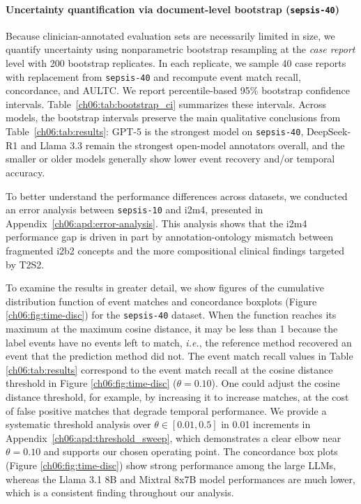 \paragraph{Uncertainty quantification via document-level bootstrap (\texttt{sepsis-40})}
Because clinician-annotated evaluation sets are necessarily limited in size, we quantify uncertainty using nonparametric bootstrap resampling at the \emph{case report} level with 200 bootstrap replicates.
In each replicate, we sample 40 case reports with replacement from \texttt{sepsis-40} and recompute event match recall, concordance, and AULTC.
We report percentile-based 95\% bootstrap confidence intervals.
Table~\ref{ch06:tab:bootstrap_ci} summarizes these intervals.
Across models, the bootstrap intervals preserve the main qualitative conclusions from Table~\ref{ch06:tab:results}: GPT-5 is the strongest model on \texttt{sepsis-40}, DeepSeek-R1 and Llama 3.3 remain the strongest open-model annotators overall, and the smaller or older models generally show lower event recovery and/or temporal accuracy.




To better understand the performance differences across datasets, we conducted an error analysis between \texttt{sepsis-10} and i2m4, presented in Appendix~\ref{ch06:apd:error-analysis}.
This analysis shows that the i2m4 performance gap is driven in part by annotation-ontology mismatch between fragmented i2b2 concepts and the more compositional clinical findings targeted by T2S2.






To examine the results in greater detail, we show figures of the cumulative distribution function of event matches and concordance boxplots (Figure \ref{ch06:fig:time-disc}) for the \texttt{sepsis-40} dataset.
When the function reaches its maximum at the maximum cosine distance, it may be less than 1 because the label events have no events left to match, \emph{i.e.}, the reference method recovered an event that the prediction method did not.
The event match recall values in Table \ref{ch06:tab:results} correspond to the event match recall at the cosine distance threshold in Figure \ref{ch06:fig:time-disc} ($\theta=0.10$).
One could adjust the cosine distance threshold, for example, by increasing it to increase matches, at the cost of false positive matches that degrade temporal performance.
We provide a systematic threshold analysis over $\theta \in [0.01, 0.5]$ in 0.01 increments in Appendix~\ref{ch06:apd:threshold_sweep}, which demonstrates a clear elbow near $\theta=0.10$ and supports our chosen operating point.
The concordance box plots (Figure \ref{ch06:fig:time-disc}) show strong performance among the large LLMs, whereas the Llama 3.1 8B and Mixtral 8x7B model performances are much lower, which is a consistent finding throughout our analysis.

